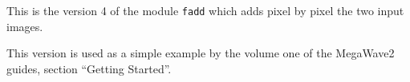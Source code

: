 This is the version 4 of the module \verb+fadd+
which adds pixel by pixel the two input images. 

This version is used as a simple example
by the volume one of the MegaWave2 guides,
section ``Getting Started''.
